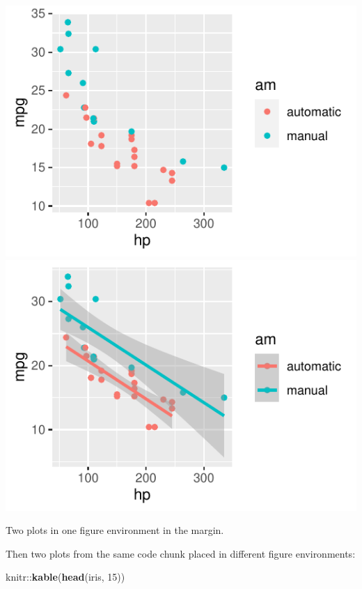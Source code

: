 \documentclass[]{tufte-book}
\newenvironment{Shaded}{}{}
\newcommand{\DecValTok}[1]{\textcolor[rgb]{0.25,0.63,0.44}{#1}}
\newcommand{\KeywordTok}[1]{\textcolor[rgb]{0.00,0.44,0.13}{\textbf{#1}}}
\newcommand{\NormalTok}[1]{#1}
\newcommand{\OperatorTok}[1]{\textcolor[rgb]{0.40,0.40,0.40}{#1}}
\begin{document}
\begin{marginfigure}
\includegraphics{deleteme_files/figure-latex/fig-margin-together-1} \includegraphics{deleteme_files/figure-latex/fig-margin-together-2} \caption[Two plots in one figure environment in the margin]{Two plots in one figure environment in the margin.}\label{fig:fig-margin-together}
\end{marginfigure}

Then two plots from the same code chunk placed in different figure
environments:

\begin{Shaded}
\begin{Highlighting}[]
\NormalTok{knitr}\OperatorTok{::}\KeywordTok{kable}\NormalTok{(}\KeywordTok{head}\NormalTok{(iris, }\DecValTok{15}\NormalTok{))}
\end{Highlighting}
\end{Shaded}
\end{document}
